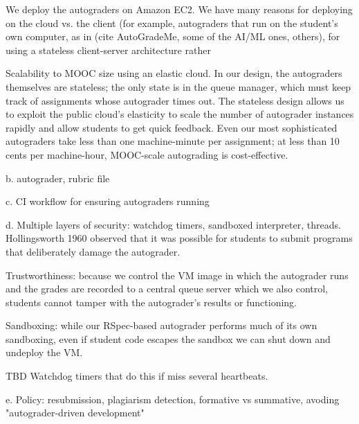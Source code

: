 We deploy the autograders on Amazon EC2.  We have many reasons for
deploying on the cloud vs. the client (for example, autograders that run on
the student's own computer, as in (cite AutoGradeMe, some of the AI/ML
ones, others),  for using a stateless client-server
architecture rather

Scalability to MOOC size using an elastic cloud.  In our design,
  the autograders 
  themselves are stateless; the only state is in the queue manager,
  which must keep track of assignments whose autograder times out.  The
  stateless design allows us to exploit the public cloud's elasticity to
  scale the number of 
  autograder instances rapidly and allow students to get quick
  feedback.  Even our most sophisticated autograders take less than one
  machine-minute per assignment; at less than 10 cents per machine-hour,
  MOOC-scale 
  autograding is cost-effective.

b.	autograder, rubric file

c.	CI workflow for ensuring autograders running

d.	Multiple layers of security: watchdog timers, sandboxed interpreter, threads. Hollingsworth 1960 observed that it was possible for students to submit programs that deliberately damage the autograder.

 Trustworthiness: because we control the VM image in which the
  autograder runs and the grades are recorded to a central queue server
  which we also control, students cannot tamper with the autograder's
  results or functioning.

 Sandboxing: while our RSpec-based autograder performs much of its
  own sandboxing, even if student code escapes the sandbox we can shut
  down and undeploy the VM.  

  TBD Watchdog timers that do this if miss several heartbeats.



e.	Policy: resubmission, plagiarism detection, formative vs summative, avoding "autograder-driven development"



